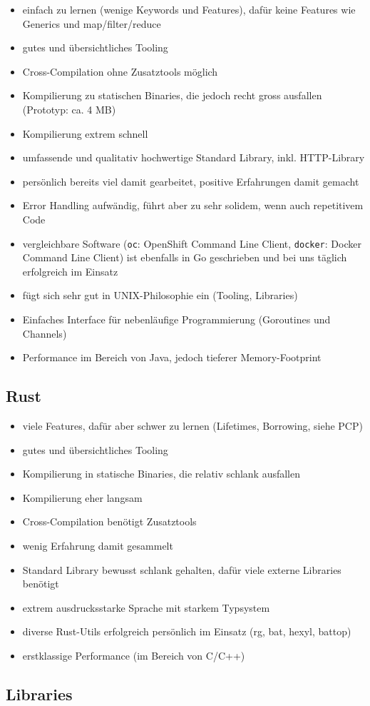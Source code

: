 \begin{itemize}
    \item einfach zu lernen (wenige Keywords und Features), dafür keine Features wie Generics und map/filter/reduce
    \item gutes und übersichtliches Tooling
    \item Cross-Compilation ohne Zusatztools möglich
    \item Kompilierung zu statischen Binaries, die jedoch recht gross ausfallen (Prototyp: ca. 4 MB)
    \item Kompilierung extrem schnell
    \item umfassende und qualitativ hochwertige Standard Library, inkl. HTTP-Library
    \item persönlich bereits viel damit gearbeitet, positive Erfahrungen damit gemacht
    \item Error Handling aufwändig, führt aber zu sehr solidem, wenn auch repetitivem Code
    \item vergleichbare Software (\texttt{oc}: OpenShift Command Line Client, \texttt{docker}: Docker Command Line Client) ist ebenfalls in Go geschrieben und bei uns täglich erfolgreich im Einsatz
    \item fügt sich sehr gut in UNIX-Philosophie ein (Tooling, Libraries)
    \item Einfaches Interface für nebenläufige Programmierung (Goroutines und Channels)
    \item Performance im Bereich von Java, jedoch tieferer Memory-Footprint
\end{itemize}

\subsection{Rust}

\begin{itemize}
    \item viele Features, dafür aber schwer zu lernen (Lifetimes, Borrowing, siehe PCP)
    \item gutes und übersichtliches Tooling
    \item Kompilierung in statische Binaries, die relativ schlank ausfallen
    \item Kompilierung eher langsam
    \item Cross-Compilation benötigt Zusatztools
    \item wenig Erfahrung damit gesammelt
    \item Standard Library bewusst schlank gehalten, dafür viele externe Libraries benötigt
    \item extrem ausdrucksstarke Sprache mit starkem Typsystem
    \item diverse Rust-Utils erfolgreich persönlich im Einsatz (rg, bat, hexyl, battop)
    \item erstklassige Performance (im Bereich von C/C++)
\end{itemize}

\subsection{Libraries}
